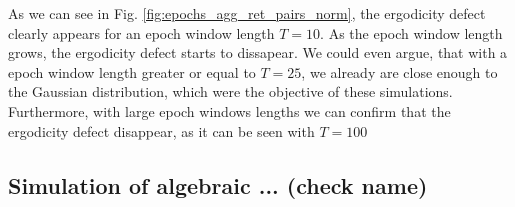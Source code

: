 As we can see in Fig. \ref{fig:epochs_agg_ret_pairs_norm}, the ergodicity
defect clearly appears for an epoch window length $T = 10$. As the epoch window
length grows, the ergodicity defect starts to dissapear. We could even argue,
that with a epoch window length greater or equal to $T = 25$, we already are
close enough to the Gaussian distribution, which were the objective of these
simulations. Furthermore, with large epoch windows lengths we can confirm that
the ergodicity defect disappear, as it can be seen with $T = 100$

\subsection{Simulation of algebraic ... (check name)}
\label{subsec:algebraic_sim}